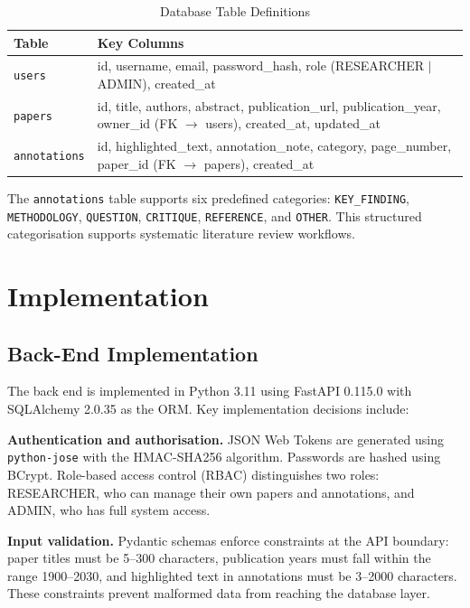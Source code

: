 \documentclass[conference]{IEEEtran}
\begin{document}
\begin{table}[htbp]
\centering
\caption{Database Table Definitions}
\label{tab:database}
\begin{tabular}{@{}p{1.8cm}p{6cm}@{}}
\toprule
\textbf{Table} & \textbf{Key Columns} \\
\midrule
\texttt{users} & id, username, email, password\_hash, role (RESEARCHER $|$ ADMIN), created\_at \\
\texttt{papers} & id, title, authors, abstract, publication\_url, publication\_year, owner\_id (FK $\rightarrow$ users), created\_at, updated\_at \\
\texttt{annotations} & id, highlighted\_text, annotation\_note, category, page\_number, paper\_id (FK $\rightarrow$ papers), created\_at \\
\bottomrule
\end{tabular}
\end{table}

The \texttt{annotations} table supports six predefined categories: \texttt{KEY\_FINDING}, \texttt{METHODOLOGY}, \texttt{QUESTION}, \texttt{CRITIQUE}, \texttt{REFERENCE}, and \texttt{OTHER}. This structured categorisation supports systematic literature review workflows.

\section{Implementation}
\label{sec:implementation}

\subsection{Back-End Implementation}

The back end is implemented in Python 3.11 using FastAPI 0.115.0 with SQLAlchemy 2.0.35 as the ORM. Key implementation decisions include:

\textbf{Authentication and authorisation.} JSON Web Tokens are generated using \texttt{python-jose} with the HMAC-SHA256 algorithm. Passwords are hashed using BCrypt. Role-based access control (RBAC) distinguishes two roles: RESEARCHER, who can manage their own papers and annotations, and ADMIN, who has full system access.

\textbf{Input validation.} Pydantic schemas enforce constraints at the API boundary: paper titles must be 5--300 characters, publication years must fall within the range 1900--2030, and highlighted text in annotations must be 3--2000 characters. These constraints prevent malformed data from reaching the database layer.
\end{document}
